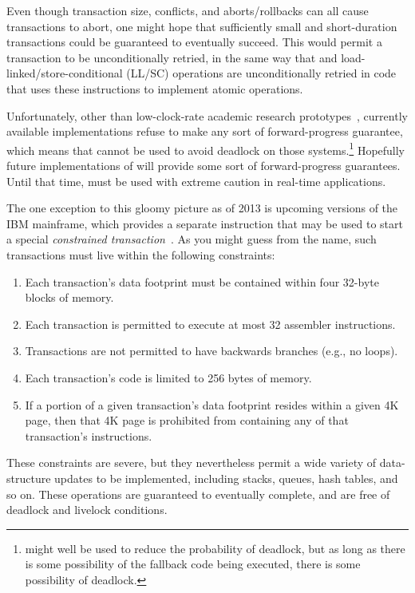 Even though transaction size, conflicts, and aborts/rollbacks can all
cause transactions to abort, one might hope that sufficiently small and
short-duration transactions could be guaranteed to eventually succeed.
This would permit a transaction to be unconditionally retried, in the
same way that  and load-linked/store-conditional
(LL/SC) operations are unconditionally retried in code that uses these
instructions to implement atomic operations.

Unfortunately, other than low-clock-rate academic research
prototypes~\cite{MartinSchoeberl2010realtimeTM},
currently available  implementations refuse to make any
sort of forward-progress guarantee, which means that  cannot be
used to avoid deadlock on those systems.\footnote{
	 might well be used to reduce the probability of deadlock,
	but as long as there is some possibility of the fallback
	code being executed, there is some possibility of deadlock.}
Hopefully future implementations of  will provide some sort of
forward-progress guarantees.
Until that time,  must be used with extreme caution in real-time
applications.

The one exception to this gloomy picture as of 2013 is upcoming versions
of the IBM mainframe, which provides a separate instruction that may be
used to start a special
\emph{constrained transaction}~\cite{ChristianJacobi2012MainframeTM}.
As you might guess from the name, such transactions must live within
the following constraints:

\begin{enumerate}
\item	Each transaction's data footprint must be contained within
	four 32-byte blocks of memory.
\item	Each transaction is permitted to execute at most 32 assembler
	instructions.
\item	Transactions are not permitted to have backwards branches
	(e.g., no loops).
\item	Each transaction's code is limited to 256 bytes of memory.
\item	If a portion of a given transaction's data footprint resides
	within a given 4K page, then that 4K page is prohibited from
	containing any of that transaction's instructions.
\end{enumerate}

These constraints are severe, but they nevertheless permit a wide variety
of data-structure updates to be implemented, including stacks, queues,
hash tables, and so on.
These operations are guaranteed to eventually complete, and are free of
deadlock and livelock conditions.


